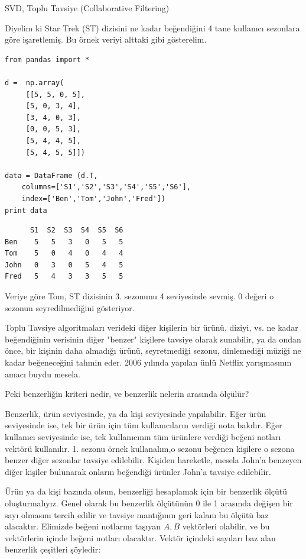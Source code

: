 \documentclass[12pt,fleqn]{article}\usepackage{../../common}
\begin{document}
SVD, Toplu Tavsiye (Collaborative Filtering) 

Diyelim ki Star Trek (ST) dizisini ne kadar beğendiğini 4 tane
kullanıcı sezonlara göre işaretlemiş. Bu örnek veriyi alttaki gibi
gösterelim.

\begin{verbatim}
from pandas import *

d =  np.array(
     [[5, 5, 0, 5],
     [5, 0, 3, 4],
     [3, 4, 0, 3],
     [0, 0, 5, 3],
     [5, 4, 4, 5],
     [5, 4, 5, 5]])

data = DataFrame (d.T,
    columns=['S1','S2','S3','S4','S5','S6'],
    index=['Ben','Tom','John','Fred'])
print data
\end{verbatim}

\begin{verbatim}
      S1  S2  S3  S4  S5  S6
Ben    5   5   3   0   5   5
Tom    5   0   4   0   4   4
John   0   3   0   5   4   5
Fred   5   4   3   3   5   5
\end{verbatim}

Veriye göre Tom, ST dizisinin 3. sezonunu 4 seviyesinde sevmiş. 0
değeri o sezonun seyredilmediğini gösteriyor.

Toplu Tavsiye algoritmaları verideki diğer kişilerin bir ürünü, diziyi, vs. ne
kadar beğendiğinin verisinin diğer "benzer" kişilere tavsiye olarak sunabilir,
ya da ondan önce, bir kişinin daha almadığı ürünü, seyretmediği sezonu,
dinlemediği müziği ne kadar beğeneceğini tahmin eder. 2006 yılında yapılan ünlü
Netflix yarışmasının amacı buydu mesela.

Peki benzerliğin kriteri nedir, ve benzerlik nelerin arasında ölçülür?

Benzerlik, ürün seviyesinde, ya da kişi seviyesinde yapılabilir. Eğer ürün
seviyesinde ise, tek bir ürün için tüm kullanıcıların verdiği nota
bakılır. Eğer kullanıcı seviyesinde ise, tek kullanıcının tüm ürünlere
verdiği beğeni notları vektörü kullanılır. 1. sezonu örnek kullanalım,o
sezonu beğenen kişilere o sezona benzer diğer sezonlar tavsiye
edilebilir. Kişiden hareketle, mesela John'a benzeyen diğer kişiler
bulunarak onların beğendiği ürünler John'a tavsiye edilebilir.

Ürün ya da kişi bazında olsun, benzerliği hesaplamak için bir benzerlik
ölçütü oluşturmalıyız. Genel olarak bu benzerlik ölçütünün 0 ile 1 arasında
değişen bir sayı olmasını tercih edilir ve tavsiye mantığının geri kalanı
bu ölçütü baz alacaktır. Elimizde beğeni notlarını taşıyan $A,B$ vektörleri
olabilir, ve bu vektörlerin içinde beğeni notları olacaktır. Vektör
içindeki sayıları baz alan benzerlik çeşitleri şöyledir:
\end{document}
